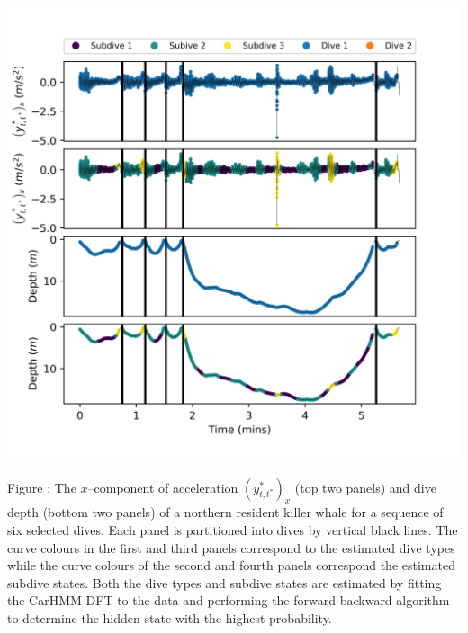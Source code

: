 \documentclass{article}
\begin{document}
        \begin{center}
        \includegraphics[width=6in]{../Plots/CarHMM_decoded_dives.png}
        \end{center}
        
        \noindent Figure : The $x$--component of acceleration $\left(y^*_{t,t^*}\right)_x$ (top two panels) and dive depth (bottom two panels) of a northern resident killer whale for a sequence of six selected dives. Each panel is partitioned into dives by vertical black lines. The curve colours in the first and third panels correspond to the estimated dive types while the curve colours of the second and fourth panels correspond the estimated subdive states. Both the dive types and subdive states are estimated by fitting the CarHMM-DFT to the data and performing the forward-backward algorithm to determine the hidden state with the highest probability.
        \addtocounter{fignum}{1}
        
\end{document}
